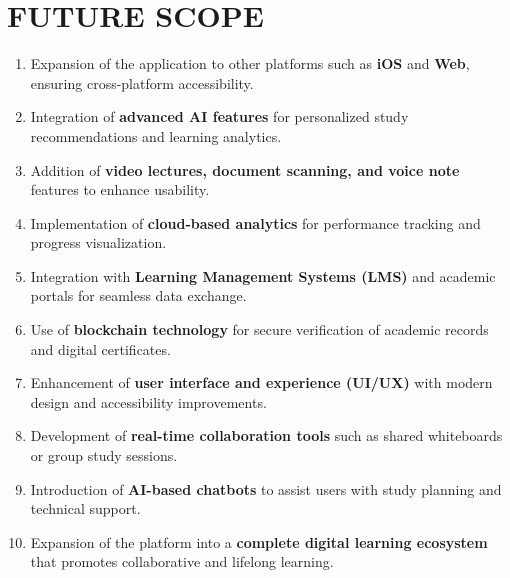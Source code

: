 \documentclass[12,Times new Roman,a4paper]{report}
\begin{document}
 
\section{FUTURE SCOPE}
\begin{enumerate}
    \item Expansion of the application to other platforms such as \textbf{iOS} and \textbf{Web}, ensuring cross-platform accessibility.
    \vspace{0.3cm}

    \item Integration of \textbf{advanced AI features} for personalized study recommendations and learning analytics.
    \vspace{0.3cm}

    \item Addition of \textbf{video lectures, document scanning, and voice note} features to enhance usability.
    \vspace{0.3cm}

    \item Implementation of \textbf{cloud-based analytics} for performance tracking and progress visualization.
    \vspace{0.3cm}

    \item Integration with \textbf{Learning Management Systems (LMS)} and academic portals for seamless data exchange.
    \vspace{0.3cm}

    \item Use of \textbf{blockchain technology} for secure verification of academic records and digital certificates.
    \vspace{0.3cm}

    \item Enhancement of \textbf{user interface and experience (UI/UX)} with modern design and accessibility improvements.
    \vspace{0.3cm}

    \item Development of \textbf{real-time collaboration tools} such as shared whiteboards or group study sessions.
    \vspace{0.3cm}

    \item Introduction of \textbf{AI-based chatbots} to assist users with study planning and technical support.
    \vspace{0.3cm}

    \item Expansion of the platform into a \textbf{complete digital learning ecosystem} that promotes collaborative and lifelong learning.
\end{enumerate}
\end{document}
